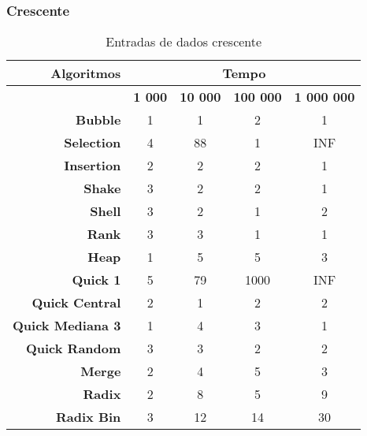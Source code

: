 \documentclass[
	12pt,				%
	oneside,			%
	a4paper,			%
	english,			%
	brazil,				%
	]{article}
\begin{document}
\subsubsection{Crescente}
\begin{table}[H]
\centering
\begin{tabular}{|r|c|c|c|c|}
\cline{1-5} 
  \textbf{Algoritmos} & \multicolumn{4}{|c|}{\textbf{Tempo}}  \\
 \hline
 \textbf{} & \textbf{1 000} & \textbf{10 000} & \textbf{100 000} & \textbf{1 000 000}\\
 \hline
 \textbf{Bubble} & 1 & 1 & 2 & 1 \\
 \hline
 \textbf{Selection} & 4 & 88 & 1 & INF \\
 \hline
 \textbf{Insertion} & 2 & 2 & 2 & 1 \\
 \hline
 \textbf{Shake} & 3 & 2 & 2 & 1 \\
 \hline
 \textbf{Shell} & 3 & 2 & 1 & 2 \\
 \hline
 \textbf{Rank} & 3 & 3 & 1 & 1 \\
 \hline
 \textbf{Heap} & 1 & 5 & 5 & 3 \\
 \hline
 \textbf{Quick 1} & 5 & 79 & 1000 & INF \\
 \hline
 \textbf{Quick Central} & 2 & 1 & 2 & 2 \\
 \hline
 \textbf{Quick Mediana 3} & 1 & 4 & 3 & 1 \\
 \hline
 \textbf{Quick Random} & 3 & 3 & 2 & 2 \\
 \hline
 \textbf{Merge} & 2 & 4 & 5 & 3 \\
 \hline
 \textbf{Radix} & 2 & 8 & 5 & 9 \\
 \hline
 \textbf{Radix Bin} & 3 & 12 & 14 & 30 \\
 \hline
\end{tabular} 
\caption{Entradas de dados crescente}
\end{table}
\end{document}
